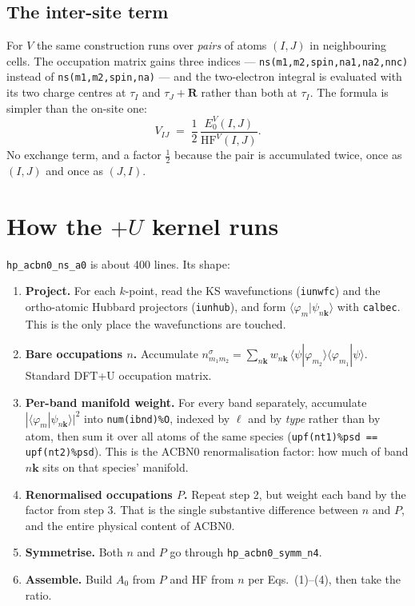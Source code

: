 \documentclass[11pt,a4paper]{article}
\newcommand{\C}[1]{\texttt{\small #1}}
\begin{document}
\subsection{The inter-site term}

For $V$ the same construction runs over \emph{pairs} of atoms $(I,J)$ in
neighbouring cells. The occupation matrix gains three indices ---
\C{ns(m1,m2,spin,na1,na2,nnc)} instead of \C{ns(m1,m2,spin,na)} --- and the
two-electron integral is evaluated with its two charge centres at
$\tau_{I}$ and $\tau_{J}+\mathbf{R}$ rather than both at $\tau_I$. The
formula is simpler than the on-site one:
\[
V_{IJ} \;=\; \frac{1}{2}\,\frac{E_0^{V}(I,J)}{\mathrm{HF}^{V}(I,J)} .
\]
No exchange term, and a factor $\tfrac12$ because the pair is accumulated twice,
once as $(I,J)$ and once as $(J,I)$.

\section{How the $+U$ kernel runs}

\C{hp_acbn0_ns_a0} is about 400 lines. Its shape:

\begin{enumerate}[leftmargin=1.6em,itemsep=3pt]
\item \textbf{Project.} For each $k$-point, read the KS wavefunctions
      (\C{iunwfc}) and the ortho-atomic Hubbard projectors (\C{iunhub}), and
      form $\langle \varphi_m | \psi_{n\mathbf{k}}\rangle$ with \C{calbec}.
      This is the only place the wavefunctions are touched.
\item \textbf{Bare occupations $n$.} Accumulate
      $n^\sigma_{m_1m_2} = \sum_{n\mathbf{k}} w_{n\mathbf{k}}\,
      \langle\psi|\varphi_{m_2}\rangle\langle\varphi_{m_1}|\psi\rangle$.
      Standard DFT+U occupation matrix.
\item \textbf{Per-band manifold weight.} For every band separately, accumulate
      $|\langle\varphi_m|\psi_{n\mathbf{k}}\rangle|^2$ into
      \C{num(ibnd)\%O}, indexed by $\ell$ and by \emph{type} rather than by
      atom, then sum it over all atoms of the same species
      (\C{upf(nt1)\%psd == upf(nt2)\%psd}). This is the ACBN0 renormalisation
      factor: how much of band $n\mathbf{k}$ sits on that species' manifold.
\item \textbf{Renormalised occupations $P$.} Repeat step 2, but weight each band
      by the factor from step 3. That is the single substantive difference
      between $n$ and $P$, and the entire physical content of ACBN0.
\item \textbf{Symmetrise.} Both $n$ and $P$ go through \C{hp_acbn0_symm_n4}.
\item \textbf{Assemble.} Build $A_0$ from $P$ and HF from $n$ per
      Eqs.~(1)--(4), then take the ratio.
\end{enumerate}
\end{document}
